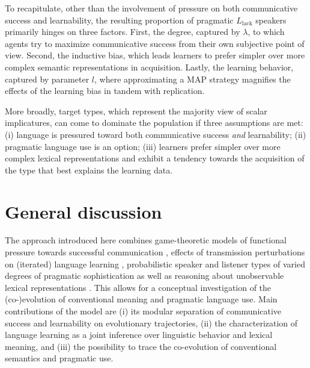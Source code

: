 \documentclass[a4paper, 11pt]{article}
\theoremstyle{Satz}
\newcommand{\mylang}[1]{\ensuremath{L_{\text{#1}}}\xspace} %
\newcommand{\Llack}{\mylang{lack}}
\begin{document}
To recapitulate, other than the involvement of pressure on both communicative success and learnability,
the resulting proportion of pragmatic $\Llack$ speakers primarily hinges on three
factors. First, the degree, captured by $\lambda$, to which agents try to maximize
communicative success from their own subjective point of view. Second, the inductive bias,
which leads learners to prefer simpler over more complex semantic representations in
acquisition. Lastly, the learning behavior, captured by parameter $l$, where approximating a
MAP strategy magnifies the effects of the learning bias in tandem with replication. 


More broadly, target types, which represent the majority view of scalar implicatures, can come to
dominate the population if three assumptions are met: (i) language is pressured toward both
communicative success {\em and} learnability; (ii) pragmatic language use is an option; (iii) learners prefer
simpler over more complex lexical representations and exhibit a tendency towards the
acquisition of the type that best explains the learning data.


\section{General discussion}\label{sec:discussion}
The approach introduced here combines game-theoretic models of functional pressure towards
successful communication \citep{nowak+krakauer:1999}, effects of transmission perturbations on
(iterated) language learning \citep{griffiths+kalish:2007}, probabilistic speaker and listener
types of varied degrees of pragmatic sophistication \citep{frank+goodman:2012,
  franke+jaeger:2014} as well as reasoning about unobservable lexical representations
\citep{bergen+etal:2012,bergen+etal:2016}. This allows for a conceptual investigation of the
(co-)evolution of conventional meaning and pragmatic language use. Main contributions of the
model are (i) its modular separation of communicative success and learnability on evolutionary
trajectories, (ii) the characterization of language learning as a joint inference over
linguistic behavior and lexical meaning, and (iii) the possibility to trace the co-evolution of
conventional semantics and pragmatic use.
\end{document}
